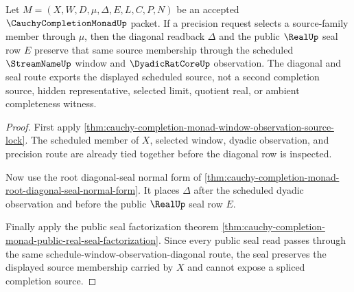 \begin{theorem}
\label{thm:cauchy-completion-monad-diagonal-seal-source-lock}
Let $M=(X,W,D,\mu,\Delta,E,L,C,P,N)$ be an accepted $\CauchyCompletionMonadUp$ packet. If a precision request selects a source-family member through $\mu$, then the diagonal readback $\Delta$ and the public $\RealUp$ seal row $E$ preserve that same source membership through the scheduled $\StreamNameUp$ window and $\DyadicRatCoreUp$ observation. The diagonal and seal route exports the displayed scheduled source, not a second completion source, hidden representative, selected limit, quotient real, or ambient completeness witness.
\end{theorem}
\begin{proof}
First apply \autoref{thm:cauchy-completion-monad-window-observation-source-lock}. The scheduled member of $X$, selected window, dyadic observation, and precision route are already tied together before the diagonal row is inspected.

Now use the root diagonal-seal normal form of \autoref{thm:cauchy-completion-monad-root-diagonal-seal-normal-form}. It places $\Delta$ after the scheduled dyadic observation and before the public $\RealUp$ seal row $E$.

Finally apply the public seal factorization theorem \autoref{thm:cauchy-completion-monad-public-real-seal-factorization}. Since every public seal read passes through the same schedule-window-observation-diagonal route, the seal preserves the displayed source membership carried by $X$ and cannot expose a spliced completion source.
\end{proof}

